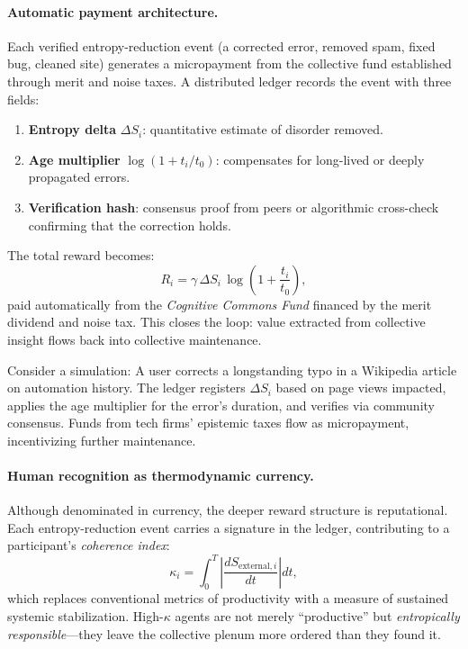 \documentclass[12pt]{article}
\begin{document}
\paragraph{Automatic payment architecture.}
Each verified entropy-reduction event (a corrected error, removed spam, fixed bug, cleaned site) generates a micropayment from the collective fund established through merit and noise taxes. A distributed ledger records the event with three fields:
\begin{enumerate}[label=(\roman*)]
    \item \textbf{Entropy delta} $\Delta S_i$: quantitative estimate of disorder removed.
    \item \textbf{Age multiplier} $\log(1+t_i/t_0)$: compensates for long-lived or deeply propagated errors.
    \item \textbf{Verification hash}: consensus proof from peers or algorithmic cross-check confirming that the correction holds.
\end{enumerate}

The total reward becomes:
\[
R_i = \gamma\,\Delta S_i\,\log\!\left(1+\frac{t_i}{t_0}\right),
\]
paid automatically from the \emph{Cognitive Commons Fund} financed by the merit dividend and noise tax. This closes the loop: value extracted from collective insight flows back into collective maintenance.

Consider a simulation: A user corrects a longstanding typo in a Wikipedia article on automation history. The ledger registers $\Delta S_i$ based on page views impacted, applies the age multiplier for the error's duration, and verifies via community consensus. Funds from tech firms' epistemic taxes flow as micropayment, incentivizing further maintenance.

\paragraph{Human recognition as thermodynamic currency.}
Although denominated in currency, the deeper reward structure is reputational. Each entropy-reduction event carries a signature in the ledger, contributing to a participant’s \emph{coherence index}:
\[
\kappa_i = \int_0^T \!\! \left|\frac{dS_{\text{external},i}}{dt}\right| dt,
\]
which replaces conventional metrics of productivity with a measure of sustained systemic stabilization. High-$\kappa$ agents are not merely ``productive'' but \emph{entropically responsible}—they leave the collective plenum more ordered than they found it.
\end{document}
